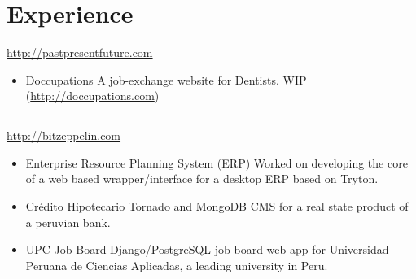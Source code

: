 \documentclass[11pt,a4paper,english]{moderncv}
\begin{document}
\maketitle

\section{Experience}
{
\url{http://pastpresentfuture.com}
\begin{itemize}
    \item Doccupations
        \newline
        A job-exchange website for Dentists.
        WIP (\url{http://doccupations.com})
\end{itemize}
}

\subsection{}

{
\url{http://bitzeppelin.com}
\newline{}
\begin{itemize}
    \item Enterprise Resource Planning System (ERP)
        \newline{}
	Worked on developing the core of a web based wrapper/interface for a desktop ERP based on Tryton.
    \item Crédito Hipotecario
        \newline{}
        Tornado and MongoDB CMS for a real state product of a peruvian bank.
    \item UPC Job Board
        \newline{}
        Django/PostgreSQL job board web app for Universidad Peruana de Ciencias Aplicadas, a leading university in Peru.
\end{itemize}
}

\subsection{}
\end{document}
